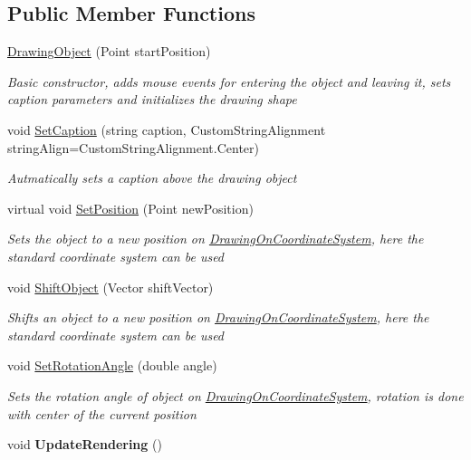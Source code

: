 \subsection*{Public Member Functions}
\begin{DoxyCompactItemize}
\item 
\hyperlink{class_w_p_f_visualization_base_1_1_drawing_object_a6f633992f77316f96f46721a6db515ab}{Drawing\+Object} (Point start\+Position)
\begin{DoxyCompactList}\small\item\em Basic constructor, adds mouse events for entering the object and leaving it, sets caption parameters and initializes the drawing shape \end{DoxyCompactList}\item 
void \hyperlink{class_w_p_f_visualization_base_1_1_drawing_object_a44229c9b6413006bebc95df3184c8cd8}{Set\+Caption} (string caption, Custom\+String\+Alignment string\+Align=Custom\+String\+Alignment.\+Center)
\begin{DoxyCompactList}\small\item\em Autmatically sets a caption above the drawing object \end{DoxyCompactList}\item 
virtual void \hyperlink{class_w_p_f_visualization_base_1_1_drawing_object_a12fa146c0e1279fb4b3e205d404e0be9}{Set\+Position} (Point new\+Position)
\begin{DoxyCompactList}\small\item\em Sets the object to a new position on \hyperlink{class_w_p_f_visualization_base_1_1_drawing_on_coordinate_system}{Drawing\+On\+Coordinate\+System}, here the standard coordinate system can be used \end{DoxyCompactList}\item 
void \hyperlink{class_w_p_f_visualization_base_1_1_drawing_object_a15a4d10a5350f03b779bd034279f0878}{Shift\+Object} (Vector shift\+Vector)
\begin{DoxyCompactList}\small\item\em Shifts an object to a new position on \hyperlink{class_w_p_f_visualization_base_1_1_drawing_on_coordinate_system}{Drawing\+On\+Coordinate\+System}, here the standard coordinate system can be used \end{DoxyCompactList}\item 
void \hyperlink{class_w_p_f_visualization_base_1_1_drawing_object_a8956da65817b5b9e75bf46ceb441432b}{Set\+Rotation\+Angle} (double angle)
\begin{DoxyCompactList}\small\item\em Sets the rotation angle of object on \hyperlink{class_w_p_f_visualization_base_1_1_drawing_on_coordinate_system}{Drawing\+On\+Coordinate\+System}, rotation is done with center of the current position \end{DoxyCompactList}\item 
void {\bfseries Update\+Rendering} ()\hypertarget{class_w_p_f_visualization_base_1_1_drawing_object_aa3e4467721485debb9789a502d90d819}{}\label{class_w_p_f_visualization_base_1_1_drawing_object_aa3e4467721485debb9789a502d90d819}

\end{DoxyCompactItemize}
